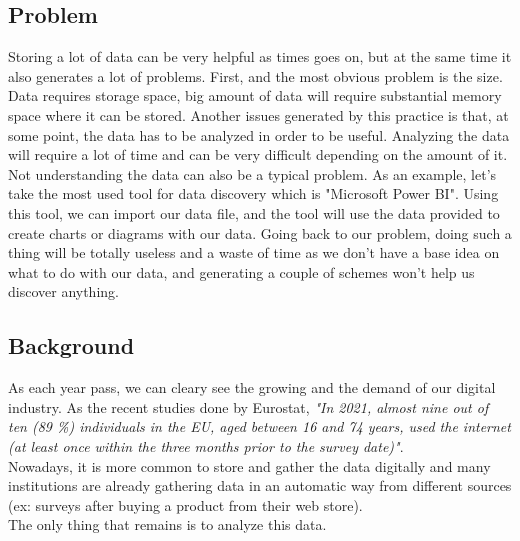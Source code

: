 \subsection{Problem}
Storing a lot of data can be very helpful as times goes on, but at the same time it also generates a lot of problems. First, and the most obvious problem is the size. Data requires storage space, big amount of data will require substantial memory space where it can be stored. Another issues generated by this practice is that, at some point, the data has to be analyzed in order to be useful. Analyzing the data will require a lot of time and can be very difficult depending on the amount of it. 
\vspace{5mm} %
\\Not understanding the data can also be a typical problem. As an example, let's take the most used tool for data discovery which is "Microsoft Power BI". Using this tool, we can import our data file, and the tool will use the data provided to create charts or diagrams with our data. Going back to our problem, doing such a thing will be totally useless and a waste of time as we don't have a base idea on what to do with our data, and generating a couple of schemes won't help us discover anything.

\subsection{Background}
As each year pass, we can cleary see the growing and the demand of our digital industry. As the recent studies done by Eurostat, \textit{"In 2021, almost nine out of ten (89 \%) individuals in the EU, aged between 16 and 74 years, used the internet (at least once within the three months prior to the survey date)"}. 
\vspace{5mm} %
\\Nowadays, it is more common to store and gather the data digitally and many institutions are already gathering data in an automatic way from different sources (ex: surveys after buying a product from their web store).
\vspace{5mm} %
\\The only thing that remains is to analyze this data.

